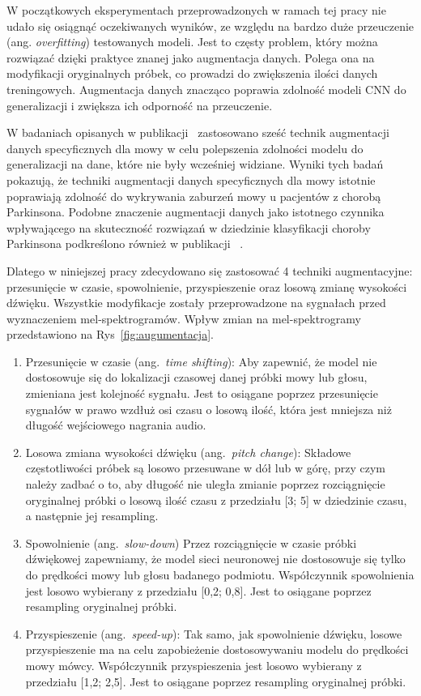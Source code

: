 W początkowych eksperymentach przeprowadzonych w ramach tej pracy nie udało się osiągnąć oczekiwanych wyników, ze względu na bardzo duże przeuczenie (ang. \emph{overfitting}) testowanych modeli.
Jest to częsty problem, który można rozwiązać dzięki praktyce znanej jako augmentacja danych.
Polega ona na modyfikacji oryginalnych próbek, co prowadzi do zwiększenia ilości danych treningowych.
Augmentacja danych znacząco poprawia zdolność modeli CNN do generalizacji i zwiększa ich odporność na przeuczenie.

W badaniach opisanych w publikacji~\cite{augmentation} zastosowano sześć technik augmentacji danych specyficznych dla mowy w celu polepszenia zdolności modelu do generalizacji na dane, które nie były wcześniej widziane.
Wyniki tych badań pokazują, że techniki augmentacji danych specyficznych dla mowy istotnie poprawiają zdolność do wykrywania zaburzeń mowy u pacjentów z chorobą Parkinsona.
Podobne znaczenie augmentacji danych jako istotnego czynnika wpływającego na skuteczność rozwiązań w dziedzinie klasyfikacji choroby Parkinsona podkreślono również w publikacji~\cite{Wodzinski} .

Dlatego w niniejszej pracy zdecydowano się zastosować 4 techniki augmentacyjne: przesunięcie w czasie, spowolnienie, przyspieszenie oraz losową zmianę wysokości dźwięku.
Wszystkie modyfikacje zostały przeprowadzone na sygnałach przed wyznaczeniem mel-spektrogramów.
Wpływ zmian na mel-spektrogramy przedstawiono na Rys~\ref{fig:augumentacja}.


\begin{enumerate}[label={\alph*)}]
	\item Przesunięcie w czasie (ang.~\emph{time shifting}): Aby zapewnić, że model nie dostosowuje się do lokalizacji czasowej danej próbki mowy lub głosu, zmieniana jest kolejność sygnału.
Jest to osiągane poprzez przesunięcie sygnałów w prawo wzdłuż osi czasu o losową ilość, która jest mniejsza niż długość wejściowego nagrania audio.
    \item Losowa zmiana wysokości dźwięku (ang.~\emph{pitch change}): Składowe częstotliwości próbek są losowo przesuwane w dół lub w górę, przy czym należy zadbać o to, aby długość nie uległa zmianie poprzez rozciągnięcie oryginalnej próbki o losową ilość czasu z przedziału [3; 5] w dziedzinie czasu, a następnie jej resampling.
    \item Spowolnienie (ang.~\emph{slow-down})
Przez rozciągnięcie w czasie próbki dźwiękowej zapewniamy, że model sieci neuronowej nie dostosowuje się tylko do prędkości mowy lub głosu badanego podmiotu.
Współczynnik spowolnienia jest losowo wybierany z przedziału [0,2; 0,8].
Jest to osiągane poprzez resampling oryginalnej próbki.
    \item Przyspieszenie (ang.~\emph{speed-up}): Tak samo, jak spowolnienie dźwięku, losowe przyspieszenie ma na celu zapobieżenie dostosowywaniu modelu do prędkości mowy mówcy.
Współczynnik przyspieszenia jest losowo wybierany z przedziału [1,2; 2,5].
Jest to osiągane poprzez resampling oryginalnej próbki.
\end{enumerate}


